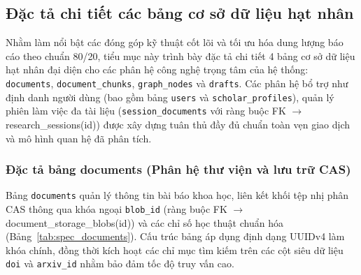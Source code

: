 \subsection{Đặc tả chi tiết các bảng cơ sở dữ liệu hạt nhân}
\label{subsec:csdl_dac_ta}

Nhằm làm nổi bật các đóng góp kỹ thuật cốt lõi và tối ưu hóa dung lượng báo cáo theo chuẩn 80/20, tiểu mục này trình bày đặc tả chi tiết 4 bảng cơ sở dữ liệu hạt nhân đại diện cho các phân hệ công nghệ trọng tâm của hệ thống: \texttt{documents}, \texttt{document\_chunks}, \texttt{graph\_nodes} và \texttt{drafts}. Các phân hệ bổ trợ như định danh người dùng (bao gồm bảng \texttt{users}\label{tab:spec_users} và \texttt{scholar\_profiles}), quản lý phiên làm việc đa tài liệu (\texttt{session\_documents} với ràng buộc FK $\to$ research\_sessions(id)) được xây dựng tuân thủ đầy đủ chuẩn toàn vẹn giao dịch và mô hình quan hệ đã phân tích.

\subsubsection{Đặc tả bảng documents (Phân hệ thư viện và lưu trữ CAS)}
Bảng \texttt{documents} quản lý thông tin bài báo khoa học, liên kết khối tệp nhị phân CAS thông qua khóa ngoại \texttt{blob\_id} (ràng buộc FK $\to$ document\_storage\_blobs(id)) và các chỉ số học thuật chuẩn hóa (Bảng~\ref{tab:spec_documents}). Cấu trúc bảng áp dụng định dạng UUIDv4 làm khóa chính, đồng thời kích hoạt các chỉ mục tìm kiếm trên các cột siêu dữ liệu \texttt{doi} và \texttt{arxiv\_id} nhằm bảo đảm tốc độ truy vấn cao.

